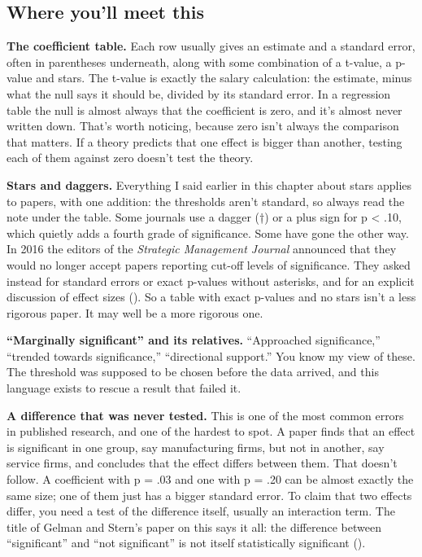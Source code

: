 \documentclass[
]{book}
\begin{document}
\subsection{Where you'll meet this}\label{where-youll-meet-this-7}

\textbf{The coefficient table.} Each row usually gives an estimate and a standard error, often in parentheses underneath, along with some combination of a t-value, a p-value and stars. The t-value is exactly the salary calculation: the estimate, minus what the null says it should be, divided by its standard error. In a regression table the null is almost always that the coefficient is zero, and it's almost never written down. That's worth noticing, because zero isn't always the comparison that matters. If a theory predicts that one effect is bigger than another, testing each of them against zero doesn't test the theory.

\textbf{Stars and daggers.} Everything I said earlier in this chapter about stars applies to papers, with one addition: the thresholds aren't standard, so always read the note under the table. Some journals use a dagger (†) or a plus sign for p \textless{} .10, which quietly adds a fourth grade of significance. Some have gone the other way. In 2016 the editors of the \emph{Strategic Management Journal} announced that they would no longer accept papers reporting cut-off levels of significance. They asked instead for standard errors or exact p-values without asterisks, and for an explicit discussion of effect sizes (). So a table with exact p-values and no stars isn't a less rigorous paper. It may well be a more rigorous one.

\textbf{``Marginally significant'' and its relatives.} ``Approached significance,'' ``trended towards significance,'' ``directional support.'' You know my view of these. The threshold was supposed to be chosen before the data arrived, and this language exists to rescue a result that failed it.

\textbf{A difference that was never tested.} This is one of the most common errors in published research, and one of the hardest to spot. A paper finds that an effect is significant in one group, say manufacturing firms, but not in another, say service firms, and concludes that the effect differs between them. That doesn't follow. A coefficient with p = .03 and one with p = .20 can be almost exactly the same size; one of them just has a bigger standard error. To claim that two effects differ, you need a test of the difference itself, usually an interaction term. The title of Gelman and Stern's paper on this says it all: the difference between ``significant'' and ``not significant'' is not itself statistically significant ().
\end{document}
